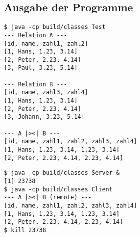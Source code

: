 \documentclass[11pt,a4paper]{scrartcl}
\begin{document}
\subsection*{Ausgabe der Programme}


\begin{verbatim}
$ java -cp build/classes Test
--- Relation A ---
[id, name, zahl1, zahl2]
[1, Hans, 1.23, 3.14]
[2, Peter, 2.23, 4.14]
[3, Paul, 3.23, 5.14]

--- Relation B ---
[id, name, zahl3, zahl4]
[1, Hans, 1.23, 3.14]
[2, Peter, 2.23, 4.14]
[3, Johann, 3.23, 5.14]

--- A |><| B ---
[id, name, zahl1, zahl2, zahl3, zahl4]
[1, Hans, 1.23, 3.14, 1.23, 3.14]
[2, Peter, 2.23, 4.14, 2.23, 4.14]
\end{verbatim}


\begin{verbatim}
$ java -cp build/classes Server &
[1] 23738
$ java -cp build/classes Client
--- A |><| B (remote) ---
[id, name, zahl1, zahl2, zahl3, zahl4]
[1, Hans, 1.23, 3.14, 1.23, 3.14]
[2, Peter, 2.23, 4.14, 2.23, 4.14]
$ kill 23738
\end{verbatim}
\end{document}
